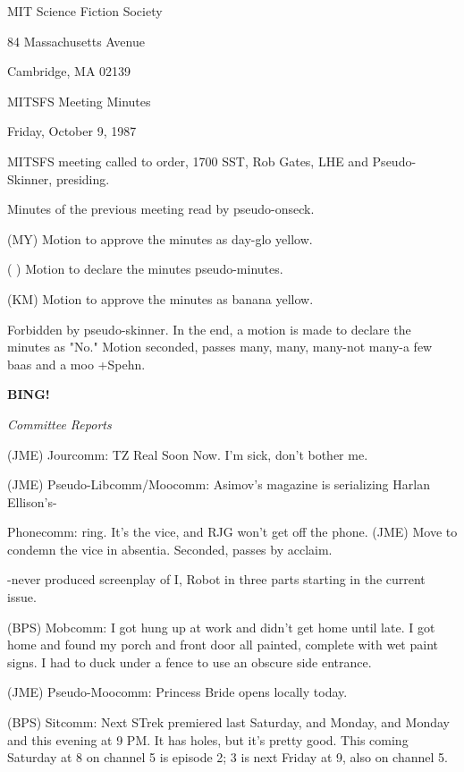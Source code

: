 \documentclass[12pt]{article}
\newcommand{\bing}{{\bf BING!} }
\newcommand{\goto}[1]{\bing \vskip 12pt \centerline{{\em{#1}}}}
\begin{document}
\begin{center}

MIT Science Fiction Society 

84 Massachusetts Avenue

Cambridge, MA 02139

\vspace{12pt}

MITSFS Meeting Minutes 

Friday, October 9, 1987

\end{center}
 
\vspace{18pt}

\setlength{\parskip}{6pt}

\noindent
MITSFS meeting called to order, 1700 SST,
Rob Gates, LHE and Pseudo-Skinner, presiding.

Minutes of the previous meeting read by pseudo-onseck.

(MY) Motion to approve the minutes as day-glo yellow.

( ) Motion to declare the minutes pseudo-minutes.

(KM) Motion to approve the minutes as banana yellow.

Forbidden by pseudo-skinner. In the end, a motion is made to declare the minutes as "No." Motion seconded, passes many, many, many-not many-a few baas and a moo +Spehn.

\goto{Committee Reports}

(JME) Jourcomm: TZ Real Soon Now. I'm sick, don't bother me.

(JME) Pseudo-Libcomm/Moocomm: Asimov's magazine is serializing Harlan Ellison's-

Phonecomm: ring. It's the vice, and RJG won't get off the phone. (JME) Move to condemn the vice in absentia. Seconded, passes by acclaim.

-never produced screenplay of I, Robot in three parts starting in the current issue.

(BPS) Mobcomm: I got hung up at work and didn't get home until late. I got home and found my porch and front door all painted, complete with wet paint signs. I had to duck under a fence to use an obscure side entrance.

(JME) Pseudo-Moocomm: Princess Bride opens locally today.

(BPS) Sitcomm: Next STrek premiered last Saturday, and Monday, and Monday and this evening at 9 PM. It has holes, but it's pretty good. This coming Saturday at 8 on channel 5 is episode 2; 3 is next Friday at 9, also on channel 5.
\end{document}
